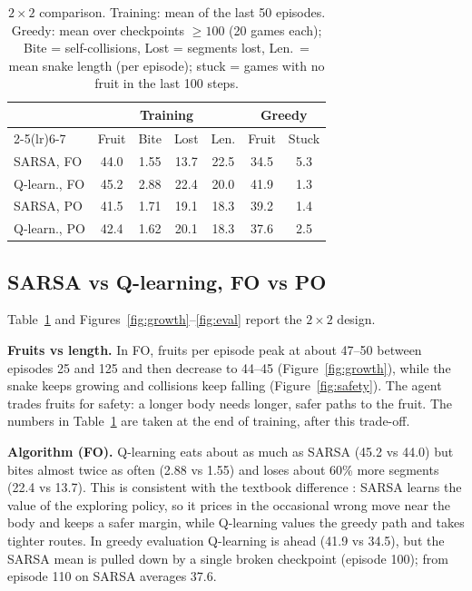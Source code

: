 \documentclass{article}
\begin{document}
\begin{table}[t]
\caption{$2\times2$ comparison. Training: mean of the last 50 episodes. Greedy: mean over checkpoints $\ge 100$ (20 games each); Bite = self-collisions, Lost = segments lost, Len.\ = mean snake length (per episode); stuck = games with no fruit in the last 100 steps.}
\label{tab:2x2}
\vskip 0.1in
\begin{center}
\begin{small}
\setlength{\tabcolsep}{3.5pt}
\begin{tabular}{lcccccc}
\toprule
 & \multicolumn{4}{c}{Training} & \multicolumn{2}{c}{Greedy} \\
\cmidrule(lr){2-5}\cmidrule(lr){6-7}
 & Fruit & Bite & Lost & Len. & Fruit & Stuck \\
\midrule
SARSA, FO      & 44.0 & 1.55 & 13.7 & 22.5 & 34.5 & 5.3 \\
Q-learn., FO   & 45.2 & 2.88 & 22.4 & 20.0 & 41.9 & 1.3 \\
SARSA, PO      & 41.5 & 1.71 & 19.1 & 18.3 & 39.2 & 1.4 \\
Q-learn., PO   & 42.4 & 1.62 & 20.1 & 18.3 & 37.6 & 2.5 \\
\bottomrule
\end{tabular}
\end{small}
\end{center}
\vskip -0.15in
\end{table}

\subsection{SARSA vs Q-learning, FO vs PO}
Table~\ref{tab:2x2} and Figures~\ref{fig:growth}--\ref{fig:eval} report the $2\times2$ design.

\textbf{Fruits vs length.} In FO, fruits per episode peak at about 47--50 between episodes 25 and 125 and then decrease to 44--45 (Figure~\ref{fig:growth}), while the snake keeps growing and collisions keep falling (Figure~\ref{fig:safety}). The agent trades fruits for safety: a longer body needs longer, safer paths to the fruit. The numbers in Table~\ref{tab:2x2} are taken at the end of training, after this trade-off.

\textbf{Algorithm (FO).} Q-learning eats about as much as SARSA (45.2 vs 44.0) but bites almost twice as often (2.88 vs 1.55) and loses about 60\% more segments (22.4 vs 13.7).
This is consistent with the textbook difference \cite{sutton2018}: SARSA learns the value of the exploring policy, so it prices in the occasional wrong move near the body and keeps a safer margin, while Q-learning values the greedy path and takes tighter routes.
In greedy evaluation Q-learning is ahead (41.9 vs 34.5), but the SARSA mean is pulled down by a single broken checkpoint (episode 100); from episode 110 on SARSA averages 37.6.
\end{document}
